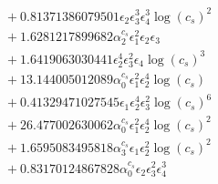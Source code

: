 \documentclass[10pt]{article}
\begin{document}
\begin{align*}
&{}  + 0.81371386079501 \epsilon_{2} \epsilon_{3}^{3} \epsilon_{4}^{3} \log{\left(c_{s} \right)}^{2} \\
&{}  + 1.6281217899682 \alpha_{2}^{c_s} \epsilon_{1}^{2} \epsilon_{2} \epsilon_{3} \\
&{}  + 1.6419063030441 \epsilon_{2}^{4} \epsilon_{3}^{2} \epsilon_{4} \log{\left(c_{s} \right)}^{3} \\
&{}  + 13.144005012089 \alpha_{0}^{c_s} \epsilon_{1}^{2} \epsilon_{2}^{4} \log{\left(c_{s} \right)} \\
&{}  + 0.41329471027545 \epsilon_{1} \epsilon_{2}^{4} \epsilon_{3}^{2} \log{\left(c_{s} \right)}^{6} \\
&{}  + 26.477002630062 \alpha_{0}^{c_s} \epsilon_{1}^{2} \epsilon_{2}^{4} \log{\left(c_{s} \right)}^{2} \\
&{}  + 1.6595083495818 \alpha_{3}^{c_s} \epsilon_{1} \epsilon_{2}^{2} \log{\left(c_{s} \right)}^{2} \\
&{}  + 0.83170124867828 \alpha_{0}^{c_s} \epsilon_{2} \epsilon_{3}^{2} \epsilon_{4}^{3}
\end{align*}
\end{document}
